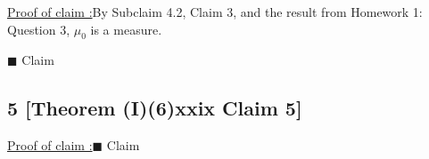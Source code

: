 \documentclass[12pt]{article}
\newcounter{ProofCounter}
\newcounter{ClaimCounter}[ProofCounter]
\newenvironment{claimproof}[1]{\par\noindent\underline{Proof of claim \theClaimCounter:}\space#1}{\hfill $\blacksquare$ Claim \theClaimCounter}
\begin{document}
\begin{claimproof}
By Subclaim 4.2, Claim 3, and the result from Homework 1: Question 3, $\mu_0$ is a measure.

\end{claimproof}



\subsection*{5 [Theorem (I)(6)xxix Claim 5]}
\begin{claimproof}

\end{claimproof}
\end{document}
